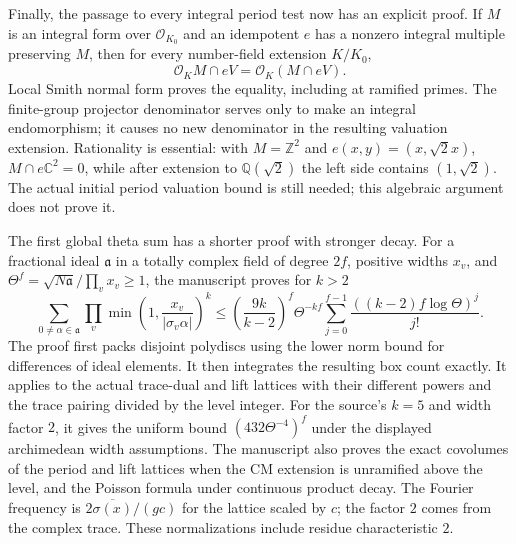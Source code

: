 \documentclass[11pt,a4paper]{article}
\theoremstyle{remark}
\newcommand{\Z}{\mathbb Z}
\newcommand{\Q}{\mathbb Q}
\newcommand{\C}{\mathbb C}
\begin{document}
Finally, the passage to every integral period test now has an
explicit proof. If $M$ is an integral form over $\mathcal O_{K_0}$
and an idempotent $e$ has a nonzero integral multiple preserving
$M$, then for every number-field extension $K/K_0$,
\[
 \mathcal O_K M\cap eV=\mathcal O_K(M\cap eV).
\]
Local Smith normal form proves the equality, including at
ramified primes. The finite-group projector denominator serves
only to make an integral endomorphism; it causes no new
denominator in the resulting valuation extension. Rationality
is essential: with $M=\Z^2$ and $e(x,y)=(x,\sqrt2x)$,
$M\cap e\C^2=0$, while after extension to $\Q(\sqrt2)$
the left side contains $(1,\sqrt2)$.
The actual initial period valuation bound is still needed;
this algebraic argument does not prove it.

The first global theta sum has a shorter proof with stronger
decay. For a fractional ideal $\mathfrak a$ in a totally complex
field of degree $2f$, positive widths $x_v$, and
$\Theta^f=\sqrt{N\mathfrak a}/\prod_vx_v\ge1$, the manuscript proves
for $k>2$
\[
 \sum_{0\ne\alpha\in\mathfrak a}
       \prod_v\min\left(1,\frac{x_v}{|\sigma_v\alpha|}\right)^k
 \le\left(\frac{9k}{k-2}\right)^f
       \Theta^{-kf}
       \sum_{j=0}^{f-1}\frac{((k-2)f\log\Theta)^j}{j!}.
\]
The proof first packs disjoint polydiscs using the lower norm
bound for differences of ideal elements. It then integrates
the resulting box count exactly. It applies to the actual
trace-dual and lift lattices with their different powers and
the trace pairing divided by the level integer.
For the source's $k=5$ and width factor $2$, it gives the
uniform bound $(432\Theta^{-4})^f$ under the displayed
archimedean width assumptions. The manuscript also proves the
exact covolumes of the period and lift lattices when the CM
extension is unramified above the level, and the Poisson formula
under continuous product decay. The Fourier frequency is
$2\overline{\sigma(x)}/(gc)$ for the lattice scaled by $c$;
the factor $2$ comes from the complex trace. These normalizations
include residue characteristic $2$.
\end{document}
